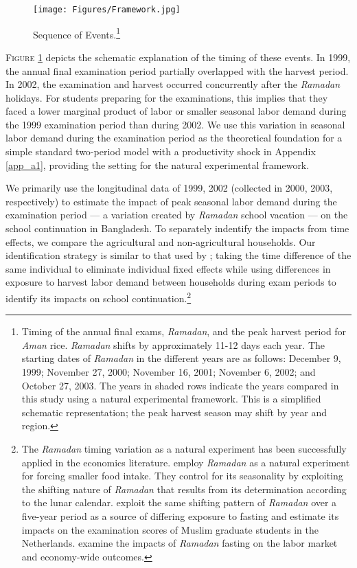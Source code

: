 \documentclass[12pt,letterpaper]{article}
\newcommand{\0}{\ensuremath{\mbox{\boldmath $0$}}}
\begin{document}
\begin{figure}[h!]
\centering
\texttt{[image: Figures/Framework.jpg]}\\
\caption{Sequence of Events.\footnote{Timing of the annual final exams, \textit{Ramadan}, and the peak harvest period for \textit{Aman} rice. \textit{Ramadan} shifts by approximately 11-12 days each year. The starting dates of \textit{Ramadan} in the different years are as follows: December 9, 1999; November 27, 2000; November 16, 2001; November 6, 2002; and October 27, 2003. The years in shaded rows indicate the years compared in this study using a natural experimental framework. This is a simplified schematic representation; the peak harvest season may shift by year and region.}}
\label{schedule}
\end{figure}

\textsc{\small Figure \ref{schedule}} depicts the schematic explanation of the timing of these events. In 1999, the annual final examination period partially overlapped with the harvest period. In 2002, the examination and harvest occurred concurrently after the \textit{Ramadan} holidays. For students preparing for the examinations, this implies that they faced a lower marginal product of labor or smaller seasonal labor demand during the 1999 examination period than during 2002. We use this variation in seasonal labor demand during the examination period as the theoretical foundation for a simple standard two-period model with a productivity shock in Appendix \ref{app_a1}, providing the setting for the natural experimental framework.

We primarily use the longitudinal data of 1999, 2002 (collected in 2000, 2003, respectively) to estimate the impact of peak seasonal labor demand during the examination period --- a variation created by \textit{Ramadan} school vacation --- on the school continuation in Bangladesh. To separately indentify the impacts from time effects, we compare the agricultural and non-agricultural households. Our identification strategy is similar to that used by \citet{OosterbeekKlaauw2013}; taking the time difference of the same individual to eliminate individual fixed effects while using differences in exposure to harvest labor demand between households during exam periods to identify its impacts on school continuation.\footnote{The \textit{Ramadan} timing variation as a natural experiment has been successfully applied in the economics literature. \citet{AlmondMazumder2011} employ \textit{Ramadan} as a natural experiment for forcing smaller food intake. They control for its seasonality by exploiting the shifting nature of \textit{Ramadan} that results from its determination according to the lunar calendar. \citet{OosterbeekKlaauw2013} exploit the same shifting pattern of \textit{Ramadan} over a five-year period as a source of differing exposure to fasting and estimate its impacts on the examination scores of Muslim graduate students in the Netherlands. \citet{Campante2013} examine the impacts of \textit{Ramadan} fasting on the labor market and economy-wide outcomes. }
\end{document}
